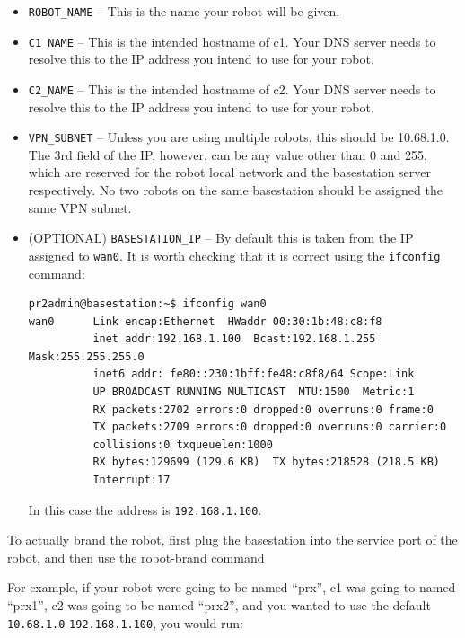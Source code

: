 \begin{itemize}
\item \texttt{ROBOT\_NAME} -- This is the name your robot will be given.
\item \texttt{C1\_NAME} -- This is the intended hostname of c1.  Your DNS server needs to resolve this to the IP address you intend to use for your robot.
\item \texttt{C2\_NAME} -- This is the intended hostname of c2.  Your DNS server needs to resolve this to the IP address you intend to use for your robot.
\item \texttt{VPN\_SUBNET} -- Unless you are using multiple robots, this should be 10.68.1.0.  The 3rd field of the IP, however, can be any value other than 0 and 255, which are reserved for the robot local network and the basestation server respectively.  No two robots on the same basestation should be assigned the same VPN subnet.
\item (OPTIONAL) \texttt{BASESTATION\_IP} -- By default this is taken from the IP assigned to \texttt{wan0}. 
 It is worth checking that it is correct using the \texttt{ifconfig} command:

  \begin{minipage}{1.0\linewidth}    
\begin{verbatim}
pr2admin@basestation:~$ ifconfig wan0
wan0      Link encap:Ethernet  HWaddr 00:30:1b:48:c8:f8  
          inet addr:192.168.1.100  Bcast:192.168.1.255  Mask:255.255.255.0
          inet6 addr: fe80::230:1bff:fe48:c8f8/64 Scope:Link
          UP BROADCAST RUNNING MULTICAST  MTU:1500  Metric:1
          RX packets:2702 errors:0 dropped:0 overruns:0 frame:0
          TX packets:2709 errors:0 dropped:0 overruns:0 carrier:0
          collisions:0 txqueuelen:1000 
          RX bytes:129699 (129.6 KB)  TX bytes:218528 (218.5 KB)
          Interrupt:17 

\end{verbatim}
  \end{minipage}
In this case the address is \texttt{192.168.1.100}.
\end{itemize}

To actually brand the robot, first plug the basestation into the
service port of the robot, and then use the robot-brand command

For example, if your robot were going to be named ``prx'', c1 was
going to named ``prx1'', c2 was going to be named ``prx2'', and you
wanted to use the default \texttt{10.68.1.0} \texttt{192.168.1.100}, you would run:

